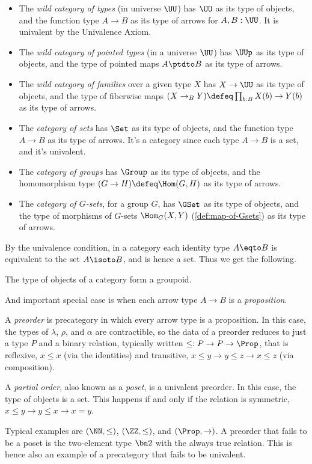 \begin{itemize}
\item
  The \emph{wild category of types} (in universe $\UU$) has $\UU$
  as its type of objects, and the function type $A \to B$ as its type of arrows
  for $A,B :\UU$. It is univalent by the Univalence Axiom.
\item
  The \emph{wild category of pointed types} (in a universe $\UU$) has
  $\UUp$ as its type of objects, and the type of pointed maps $A \ptdto B$ as its type of arrows.
\item
  The \emph{wild category of families} over a given type $X$ has
  $X \to \UU$ as its type of objects, and the type of fiberwise maps
  $(X \to_B Y) \defeq \prod_{b:B}X(b) \to Y(b)$
  as its type of arrows.
\item
  The \emph{category of sets} has $\Set$
  as its type of objects, and the function type $A \to B$ as its type of arrows.
  It's a category since each type $A\to B$ is a set, and it's univalent.
\item
  The \emph{category of groups} has $\Group$
  as its type of objects, and the homomorphism type $(G \to H) \defeq \Hom(G,H)$
  as its type of arrows.
\item
  The \emph{category of $G$-sets}, for a group $G$,
  has $\GSet$ as its type of objects, and the type of morphisms of $G$-sets
  $\Hom_G(X,Y)$ (\cref{def:map-of-Gsets}) as its type of arrows.
\end{itemize}

By the univalence condition, in a category each identity type $A \eqto B$
is equivalent to the set $A \isoto B$, and is hence a set.
Thus we get the following.
\begin{lemma}
  The type of objects of a category form a groupoid.
\end{lemma}

And important special case is when each arrow type $A \to B$ is a \emph{proposition}.
\begin{example}\label{ex:poset}
  A \emph{preorder} is precategory in which every arrow type is a proposition.
  In this case, the types of $\lambda$, $\rho$, and $\alpha$ are contractible, so the data
  of a preorder reduces to just a type $P$ and a binary relation,
  typically written $\le : P \to P \to \Prop$,
  that is reflexive, $x \le x$ (via the identities)
  and transitive, $x\le y \to y \le z \to x\le z$ (via composition).

  A \emph{partial order}, also known as a \emph{poset},
  is a univalent preorder.
  In this case, the type of objects is a set.
  This happens if and only if the relation is symmetric, $x \le y \to y \le x \to x = y$.

  Typical examples are $(\NN,\le)$, $(\ZZ,\le)$, and $(\Prop,\to)$.
  A preorder that fails to be a poset is the two-element type $\bn 2$
  with the always true relation.
  This is hence also an example of a precategory that fails to be univalent.
\end{example}

